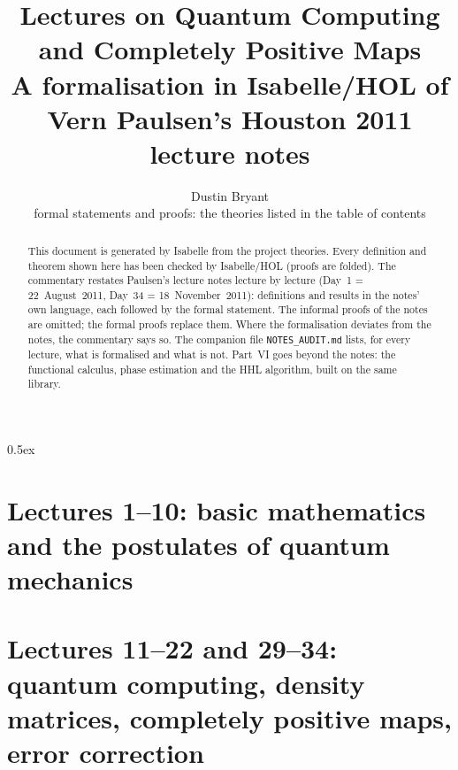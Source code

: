 \documentclass[11pt,a4paper]{article}
\theoremstyle{definition}
\begin{document}
\title{Lectures on Quantum Computing and Completely Positive Maps\\[0.5em]
  \large A formalisation in Isabelle/HOL of Vern Paulsen's Houston 2011 lecture notes}
\author{Dustin Bryant\\[0.3em]\small formal statements and proofs: the theories listed in the table of contents}
\maketitle

\begin{abstract}
This document is generated by Isabelle from the project theories.  Every
definition and theorem shown here has been checked by Isabelle/HOL (proofs are
folded).  The commentary restates Paulsen's lecture notes lecture by lecture
(Day~1 = 22~August~2011, Day~34 = 18~November~2011): definitions and results in
the notes' own language, each followed by the formal statement.  The informal
proofs of the notes are omitted; the formal proofs replace them.  Where the
formalisation deviates from the notes, the commentary says so.  The companion
file \texttt{NOTES\_AUDIT.md} lists, for every lecture, what is formalised and
what is not.  Part~VI goes beyond the notes: the functional calculus, phase
estimation and the HHL algorithm, built on the same library.
\end{abstract}

\tableofcontents
\newpage

\parindent 0pt\parskip 0.5ex



\part{Lectures 1--10: basic mathematics and the postulates of quantum mechanics}








\part{Lectures 11--22 and 29--34: quantum computing, density matrices, completely positive maps, error correction}


























\end{document}
